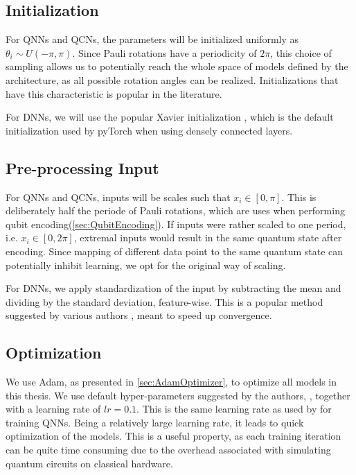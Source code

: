\subsection{Initialization}\label{sec:Initialization}
For QNNs and QCNs, the parameters will be initialized uniformly as $\theta_i \sim U(-\pi, \pi)$. Since Pauli rotations have a periodicity of $2\pi$, this choice of sampling allows us to potentially reach the whole space of models defined by the architecture, as all possible rotation angles can be realized. Initializations that have this characteristic is popular in the literature\cite{abbas2020power}\cite{skolik2020layerwise}.

For DNNs, we will use the popular Xavier initialization \cite{xavier}, which is the default initialization used by pyTorch\cite{pytorch} when using densely connected layers.

\subsection{Pre-processing Input}\label{sec:Pre-processing Input}
For QNNs and QCNs, inputs will be scales such that $x_i \in [0, \pi]$. This is deliberately half the periode of Pauli rotations, which are uses when performing qubit encoding(\autoref{sec:QubitEncoding}). If inputs were rather scaled to one period, i.e. $x_i \in [0, 2\pi]$, extremal inputs would result in the same quantum state after encoding. Since mapping of different data point to the same quantum state can potentially inhibit learning, we opt for the original way of scaling.

For DNNs, we apply standardization of the input by subtracting the mean and dividing by the standard deviation, feature-wise. This is a popular method suggested by various authors \cite{hands-on}\cite{LeCun2012}, meant to speed up convergence.

\subsection{Optimization}\label{sec:Optimization}
We use Adam, as presented in \autoref{sec:AdamOptimizer}, to optimize all models in this thesis. We use default hyper-parameters suggested by the authors, \citet{kingma2017adam}, together with a learning rate of $lr=0.1$. This is the same learning rate as used by \citet{abbas2020power} for training QNNs. Being a relatively large learning rate, it leads to quick optimization of the models. This is a useful property, as each training iteration can be quite time consuming due to the overhead associated with simulating quantum circuits on classical hardware.

